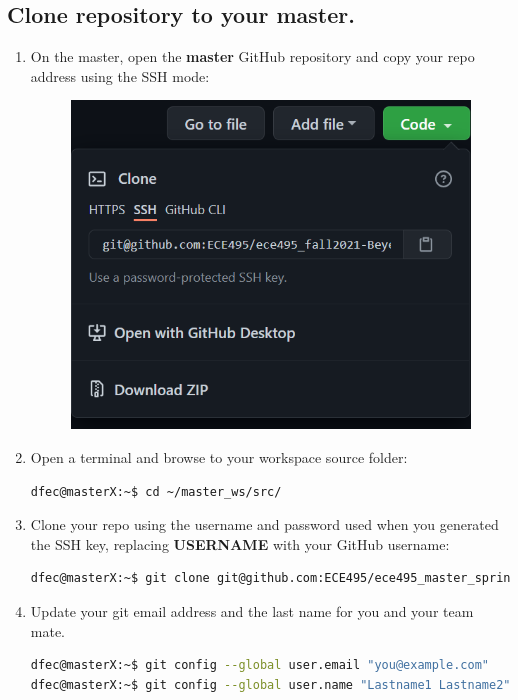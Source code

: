 \documentclass{handout}
\begin{document}
\subsection{Clone repository to your master.}
\begin{enumerate}
\item On the master, open the \textbf{master} GitHub repository and copy your repo address using the SSH mode:
\begin{figure}[H]
	\centering
	\includegraphics[width=.4\textwidth]{clone.png}
\end{figure}
\item Open a terminal and browse to your workspace source folder:
\begin{lstlisting}[language=bash]
dfec@masterX:~$ cd ~/master_ws/src/
\end{lstlisting}
\item Clone your repo using the username and password used when you generated the SSH key, replacing \textbf{USERNAME} with your GitHub username:
\begin{lstlisting}[language=bash]
dfec@masterX:~$ git clone git@github.com:ECE495/ece495_master_spring2022-USERNAME.git
\end{lstlisting}

\item Update your git email address and the last name for you and your team mate.
\begin{lstlisting}[language=bash]
dfec@masterX:~$ git config --global user.email "you@example.com"
dfec@masterX:~$ git config --global user.name "Lastname1 Lastname2"
\end{lstlisting}
\end{enumerate}
\end{document}
